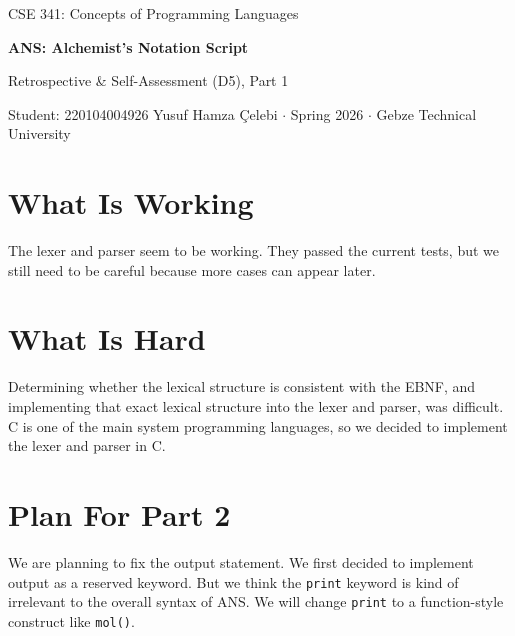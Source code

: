 \documentclass[11pt,a4paper]{article}
\newcommand{\code}[1]{\texttt{#1}}
\begin{document}
\begin{center}
  {\footnotesize\color{anscaption}CSE 341: Concepts of Programming Languages\par}
  \vspace{3pt}
  {\huge\bfseries\sffamily ANS: Alchemist's Notation Script\par}
  \vspace{4pt}
  {\large Retrospective \& Self-Assessment (D5), Part 1\par}
  \vspace{6pt}
  {\footnotesize\color{anscaption}
    Student: 220104004926 Yusuf Hamza Çelebi \(\cdot\)
    Spring 2026 \(\cdot\)
    Gebze Technical University\par}
\end{center}
\vspace{7pt}

\section{What Is Working}

The lexer and parser seem to be working. They passed the current tests, but we still need to be careful because more cases can appear later.

\section{What Is Hard}

Determining whether the lexical structure is consistent with the EBNF, and implementing that exact lexical structure into the lexer and parser, was difficult. C is one of the main system programming languages, so we decided to implement the lexer and parser in C.

\section{Plan For Part 2}

We are planning to fix the output statement. We first decided to implement output as a reserved keyword. But we think the \code{print} keyword is kind of irrelevant to the overall syntax of ANS. We will change \code{print} to a function-style construct like \code{mol()}.
\end{document}
